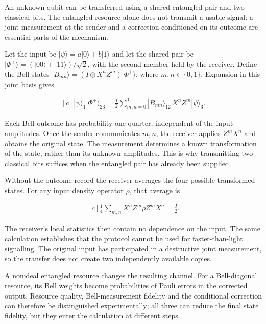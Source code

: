 \documentclass[11pt,oneside]{book}
\newenvironment{centeredalign}{\[\begin{gathered}[c]}{\end{gathered}\]}
\begin{document}
\label{topic:quantum-teleportation}

An unknown qubit can be transferred using a shared entangled pair and two classical bits. The entangled resource alone does not transmit a usable signal: a joint measurement at the sender and a correction conditioned on its outcome are essential parts of the mechanism.

Let the input be \(|\psi\rangle=a|0\rangle+b|1\rangle\) and let the shared pair be \(|\Phi^+\rangle=(|00\rangle+|11\rangle)/\sqrt2\), with the second member held by the receiver. Define the Bell states \(|B_{mn}\rangle=(I\otimes X^nZ^m)|\Phi^+\rangle\), where \(m,n\in\{0,1\}\). Expansion in this joint basis gives

\begin{centeredalign}
|\psi\rangle_1|\Phi^+\rangle_{23}
=\frac12\sum_{m,n=0}^{1}|B_{mn}\rangle_{12}\,X^nZ^m|\psi\rangle_3.
\end{centeredalign}

Each Bell outcome has probability one quarter, independent of the input amplitudes. Once the sender communicates \(m,n\), the receiver applies \(Z^mX^n\) and obtains the original state. The measurement determines a known transformation of the state, rather than its unknown amplitudes. This is why transmitting two classical bits suffices when the entangled pair has already been supplied.

Without the outcome record the receiver averages the four possible transformed states. For any input density operator \(\rho\), that average is

\begin{centeredalign}
\frac14\sum_{m,n}X^nZ^m\rho Z^mX^n=\frac I2.
\end{centeredalign}

The receiver's local statistics then contain no dependence on the input. The same calculation establishes that the protocol cannot be used for faster-than-light signalling. The original input has participated in a destructive joint measurement, so the transfer does not create two independently available copies.

A nonideal entangled resource changes the resulting channel. For a Bell-diagonal resource, its Bell weights become probabilities of Pauli errors in the corrected output. Resource quality, Bell-measurement fidelity and the conditional correction can therefore be distinguished experimentally; all three can reduce the final state fidelity, but they enter the calculation at different steps.
\end{document}
